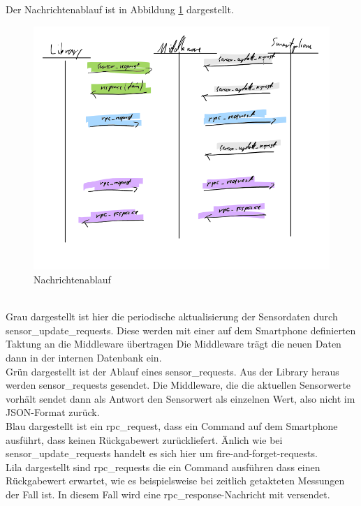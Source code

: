 \documentclass[11pt,a4paper]{report}
\begin{document}
Der Nachrichtenablauf ist in Abbildung \ref{fig:message flow} dargestellt.
\begin{figure}[htbp]
  \centering
  \includegraphics[width=.9\textwidth]{images/message_flow.png}
  \caption{Nachrichtenablauf}
  \label{fig:message flow}
\end{figure}
\\
Grau dargestellt ist hier die periodische aktualisierung der Sensordaten durch sensor\_update\_requests.
Diese werden mit einer auf dem Smartphone definierten Taktung an die Middleware übertragen
Die Middleware trägt die neuen Daten dann in der internen Datenbank ein.
\\
Grün dargestellt ist der Ablauf eines sensor\_requests.
Aus der Library heraus werden sensor\_requests gesendet.
Die Middleware, die die aktuellen Sensorwerte vorhält sendet dann als Antwort den Sensorwert als einzelnen Wert, also nicht im JSON-Format zurück.
\\
Blau dargestellt ist ein rpc\_request, dass ein Command auf dem Smartphone ausführt, dass keinen Rückgabewert zurückliefert. Änlich wie bei sensor\_update\_requests handelt es sich hier um fire-and-forget-requests.
\\
Lila dargestellt sind rpc\_requests die ein Command ausführen dass einen Rückgabewert erwartet, wie es beispielsweise bei zeitlich getakteten Messungen der Fall ist. 
In diesem Fall wird eine rpc\_response-Nachricht mit versendet.
\end{document}

